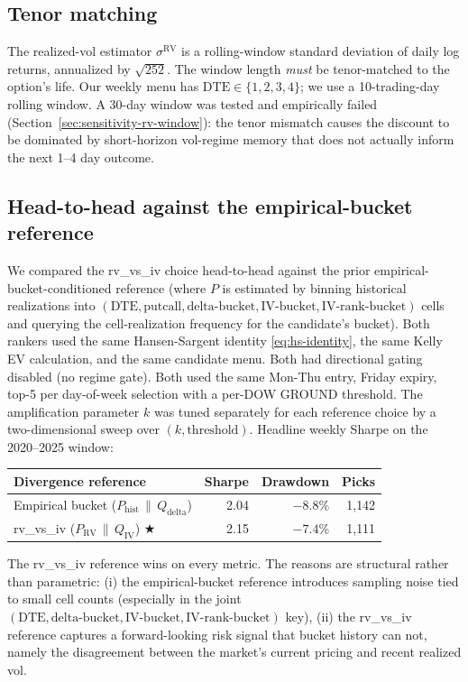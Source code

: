 \documentclass[11pt]{article}
\theoremstyle{definition}
\theoremstyle{remark}
\begin{document}
\subsection{Tenor matching}

The realized-vol estimator $\sigma^{\mathrm{RV}}$ is a rolling-window
standard deviation of daily log returns, annualized by $\sqrt{252}$.
The window length \emph{must} be tenor-matched to the option's life.
Our weekly menu has $\mathrm{DTE} \in \{1, 2, 3, 4\}$; we use a
10-trading-day rolling window. A 30-day window was tested and
empirically failed (Section~\ref{sec:sensitivity-rv-window}): the
tenor mismatch causes the discount to be dominated by short-horizon
vol-regime memory that does not actually inform the next 1--4 day
outcome.

\subsection{Head-to-head against the empirical-bucket reference}
\label{sec:rvvsiv-vs-empirical}

We compared the rv\_vs\_iv choice head-to-head against the prior
empirical-bucket-conditioned reference (where $P$ is estimated by
binning historical realizations into $(\text{DTE}, \text{putcall},
\text{delta-bucket}, \text{IV-bucket}, \text{IV-rank-bucket})$
cells and querying the cell-realization frequency for the candidate's
bucket). Both rankers used the same Hansen-Sargent identity
\eqref{eq:hs-identity}, the same Kelly EV calculation, and the same
candidate menu. Both had directional gating disabled (no regime gate).
Both used the same Mon-Thu entry, Friday expiry, top-5 per
day-of-week selection with a per-DOW GROUND threshold. The amplification
parameter $k$ was tuned separately for each reference choice by a
two-dimensional sweep over $(k, \mathrm{threshold})$. Headline weekly
Sharpe on the 2020--2025 window:
\begin{center}
\begin{tabular}{lrrr}
\toprule
Divergence reference & Sharpe & Drawdown & Picks \\
\midrule
Empirical bucket ($P_{\mathrm{hist}} \,\|\, Q_{\mathrm{delta}}$) & 2.04 & $-8.8\%$ & 1{,}142 \\
rv\_vs\_iv ($P_{\mathrm{RV}} \,\|\, Q_{\mathrm{IV}}$) $\bigstar$  & 2.15 & $-7.4\%$ & 1{,}111 \\
\bottomrule
\end{tabular}
\end{center}
The rv\_vs\_iv reference wins on every metric. The reasons are
structural rather than parametric: (i) the empirical-bucket reference
introduces sampling noise tied to small cell counts (especially in
the joint $(\text{DTE}, \text{delta-bucket}, \text{IV-bucket}, \text{IV-rank-bucket})$
key), (ii) the rv\_vs\_iv reference captures a forward-looking risk
signal that bucket history can not, namely the disagreement between
the market's current pricing and recent realized vol.
\end{document}
